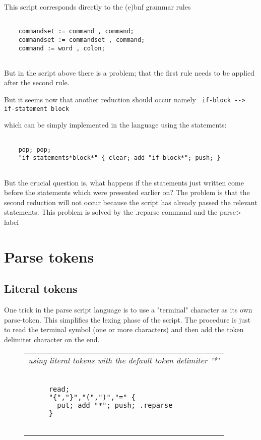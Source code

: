 \documentclass[a4paper,12pt]{article}
\begin{document}
  This script corresponds directly to the (e)bnf grammar rules 
 \begin{lstlisting}[breaklines] 

    commandset := command , command;
    commandset := commandset , command;
    command := word , colon;
  
 \end{lstlisting} 


  But in the script above there is a problem; that the first rule
  needs to be applied after the second rule.

  But it seems now that another reduction should occur namely 
 \verb| if-block --> if-statement block |

  
  which can be simply implemented in the language using the
  statements: 
 \begin{lstlisting}[breaklines] 

    pop; pop;
    "if-statements*block*" { clear; add "if-block*"; push; }
  
 \end{lstlisting} 


  But the crucial question is, what happens if the statements just written
  come before the statements which were presented earlier on? The problem is
  that the second reduction will not occur because the script has already
  passed the relevant statements. This problem is solved by the
  .reparse command and the parse> label

\section{Parse tokens}

\subsection{Literal tokens}

  One trick in the parse script language is to use a "terminal"
  character as its own parse-token. This simplifies the lexing phase
  of the script. The procedure is just to read the terminal symbol
  (one or more characters) and then add the token delimiter character
  on the end.
 \begin{figure}
 \begin{tabular}{ l }
 \emph{ using literal tokens with the default token delimiter '*' } \\ 
 \begin{lstlisting}[breaklines] 

     read; 
     "{","}","(",")","=" {
       put; add "*"; push; .reparse
     }
   
 \end{lstlisting} 
 \end{tabular} 

 \end{figure}
\end{document}
